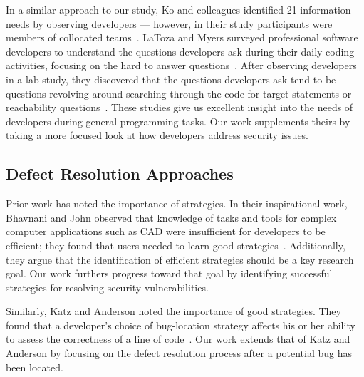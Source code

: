 \documentclass[10pt,journal,compsoc]{IEEEtran}
\begin{document}
In a similar approach to our study, Ko and colleagues identified 21 information needs by observing developers --- however, in their study participants were members of collocated teams~\cite{Ko:2007:information}. 
LaToza and Myers surveyed professional software developers to understand the questions developers ask during their daily coding activities, focusing on the hard to answer questions~\cite{latoza2010hard}. 
After observing developers in a lab study, they discovered that the questions developers ask tend to be questions revolving around searching through the code for target statements or reachability questions~\cite{latoza2010developers}. 
These studies give us excellent insight into the needs of developers during general programming tasks.
Our work supplements theirs by taking a more focused look at how developers address security issues.



\subsection{Defect Resolution Approaches}
\label{strategies}
Prior work has noted the importance of strategies.
In their inspirational work, Bhavnani and John observed that knowledge of tasks and tools for complex computer applications such as CAD were insufficient for developers to be efficient; they found that users needed to learn good strategies~\cite{Bhavnani2000}. 
Additionally, they argue that the identification of efficient strategies should be a key research goal. 
Our work furthers progress toward that goal by identifying successful strategies for resolving security vulnerabilities.

Similarly, Katz and Anderson noted the importance of good strategies. 
They found that a developer's choice of bug-location strategy affects his or her ability to assess the correctness of a line of code~\cite{Katz:1987}.
Our work extends that of Katz and Anderson by focusing on the defect resolution process after a potential bug has been located.
\end{document}
